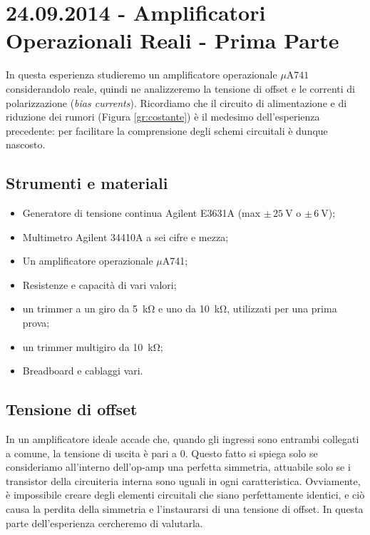 \section{24.09.2014 - Amplificatori Operazionali Reali - Prima Parte}

In questa esperienza studieremo un amplificatore operazionale $\mu$A$741$ considerandolo reale, quindi ne analizzeremo la tensione di offset e le correnti di polarizzazione (\textit{bias currents}).
Ricordiamo che il circuito di alimentazione e di riduzione dei rumori (Figura \ref{gr:costante}) è il medesimo dell'esperienza precedente: per facilitare la comprensione degli schemi circuitali è dunque nascosto.

\subsection*{Strumenti e materiali}

\begin{itemize} [noitemsep]
\item Generatore di tensione continua Agilent E3631A (max $\pm \, \SI{25}{\volt}$ o $\pm \, \SI{6}{\volt}$);
\item Multimetro Agilent 34410A a sei cifre e mezza;
\item Un amplificatore operazionale $\mu$A741;
\item Resistenze e capacità di vari valori;
\item un trimmer a un giro da \SI{5}{\kilo\ohm} e uno da \SI{10}{\kilo\ohm}, utilizzati per una prima prova;
\item un trimmer multigiro da \SI{10}{\kilo\ohm};
\item Breadboard e cablaggi vari.
\end{itemize}

\subsection{Tensione di offset}
\label{par2:offset}

In un amplificatore ideale accade che, quando gli ingressi sono entrambi collegati a comune, la tensione di uscita è pari a $0$. Questo fatto si spiega solo se consideriamo all'interno dell'op-amp una perfetta simmetria, attuabile solo se i transistor della circuiteria interna sono uguali in ogni caratteristica. Ovviamente, è impossibile creare degli elementi circuitali che siano perfettamente identici, e ciò causa la perdita della simmetria e l'instaurarsi di una tensione di offset. In questa parte dell'esperienza cercheremo di valutarla.

